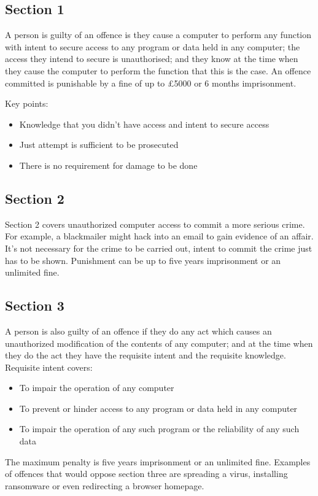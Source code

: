 \documentclass{article}
\begin{document}
	\subsection{Section 1}
		A person is guilty of an offence is they cause a computer to perform any function with intent to secure access to any program or data held in any computer; the access they intend to secure is unauthorised; and they know at the time when they cause the computer to perform the function that this is the case. An offence committed is punishable by a fine of up to £5000 or 6 months imprisonment.
		\par
		Key points:
		\begin{itemize}
			\item Knowledge that you didn't have access and intent to secure access
			\item Just attempt is sufficient to be prosecuted
			\item There is no requirement for damage to be done
		\end{itemize}
	\subsection{Section 2}
	Section 2 covers unauthorized computer access to commit a more serious crime. For example, a blackmailer might hack into an email to gain evidence of an affair. It's not necessary for the crime to be carried out, intent to commit the crime just has to be shown. Punishment can be up to five years imprisonment or an unlimited fine.
	
	\subsection{Section 3}
	A person is also guilty of an offence if they do any act which causes an unauthorized modification of the contents of any computer; and at the time when they do the act they have the requisite intent and the requisite knowledge. Requisite intent covers:
	\begin{itemize}
		\item To impair the operation of any computer
		\item To prevent or hinder access to any program or data held in any computer
		\item To impair the operation of any such program or the reliability of any such data
	\end{itemize}
	
	The maximum penalty is five years imprisonment or an unlimited fine. Examples of offences that would oppose section three are spreading a virus, installing ransomware or even redirecting a browser homepage.
	
\end{document}

